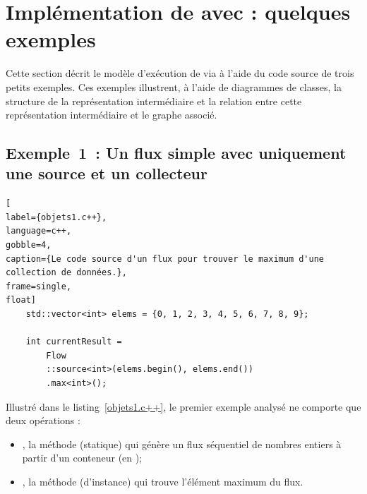 \section{Impl\'ementation de  avec  : quelques exemples}

Cette section d\'ecrit le mod\`ele d'ex\'ecution de  via  \`a l'aide du code source de trois petits exemples. Ces exemples illustrent, \`a l'aide de diagrammes de classes, la structure de la représentation intermédiaire et la relation entre cette représentation intermédiaire et le graphe  associé.


\subsection{Exemple~1~: Un flux simple avec uniquement une source et un collecteur} 


\begin{lstlisting}[
label={objets1.c++},
language=c++,
gobble=4,
caption={Le code source d'un flux pour trouver le maximum d'une collection de données.},
frame=single,
float]
    std::vector<int> elems = {0, 1, 2, 3, 4, 5, 6, 7, 8, 9};

    int currentResult =
        Flow
        ::source<int>(elems.begin(), elems.end())
        .max<int>();
\end{lstlisting}

Illustr\'e dans le listing~\ref{objets1.c++}, le premier exemple analys\'e ne comporte que deux op\'erations :

\begin{itemize}
\item {}, la méthode (statique) qui g\'en\`ere un flux s\'equentiel de nombres entiers \`a partir d'un conteneur (en ); 
\item {}, la méthode (d'instance) qui trouve l'\'el\'ement maximum du flux. 


\end{itemize}





